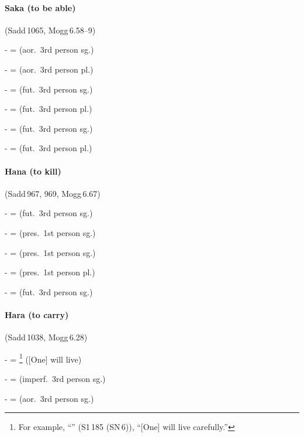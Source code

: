 \paragraph*{Saka (to be able)} (Sadd\,1065, Mogg\,6.58--9)\par
-  =  (aor.\ 3rd person sg.)\par
-  =  (aor.\ 3rd person pl.)\par
-  =  (fut.\ 3rd person sg.)\par
-  =  (fut.\ 3rd person pl.)\par
-  =  (fut.\ 3rd person sg.)\par
-  =  (fut.\ 3rd person pl.)\par

\paragraph*{Hana (to kill)} (Sadd\,967, 969, Mogg\,6.67)\par
-  =  (fut.\ 3rd person sg.)\par
-  =  (pres.\ 1st person sg.)\par
-  =  (pres.\ 1st person sg.)\par
-  =  (pres.\ 1st person pl.)\par
-  =  (fut.\ 3rd person sg.)\par

\paragraph*{Hara (to carry)} (Sadd\,1038, Mogg\,6.28)\par
-  = \footnote{For example, ``'' (S1\,185 (SN\,6)), ``[One] will live carefully.''} ([One] will live)\par
-  =  (imperf.\ 3rd person sg.)\par
-  =  (aor.\ 3rd person sg.)\par

